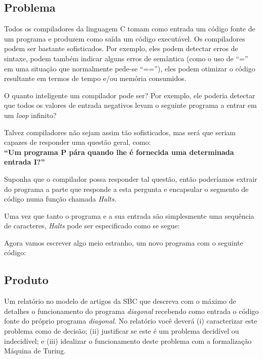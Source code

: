 \subsection{Problema}
Todos os compiladores da linguagem C tomam como entrada um código fonte de um
programa e produzem como saída um código executável.
Os compiladores podem ser bastante sofisticados. Por exemplo, eles
podem detectar erros de sintaxe, podem também indicar alguns erros de
semântica (como o uso de ``='' em uma situação que normalmente pede-se ``==''),
eles podem otimizar o código resultante em termos de tempo e/ou memória consumidos.

O quanto inteligente um compilador pode ser?
Por exemplo, ele poderia detectar que todos os valores de entrada negativos
levam o seguinte programa a entrar em um \textit{loop} infinito?



Talvez compiladores não sejam assim tão sofisticados, mas será
que seriam capazes de responder uma questão geral, como:
\\ \textbf{``Um programa P pára quando
lhe é fornecida uma determinada entrada I?''}

Suponha que o compilador possa responder tal questão, então poderíamos extrair
do programa a parte que responde a esta pergunta e
encapsular o segmento de código numa função chamada \textit{Halts}.


Uma vez que tanto o programa e a sua
entrada são simplesmente uma sequência de caracteres, \textit{Halts} pode ser
especificado como se segue:



Agora vamos escrever algo meio estranho, um novo programa com o seguinte código:



\subsection{Produto}
Um relatório no modelo de artigos da SBC que descreva com o máximo
de detalhes o funcionamento do programa \textit{diagonal} recebendo como entrada
o código fonte do próprio programa \textit{diagonal}.
No relatório você deverá (i) caracterizar este problema como de decisão;
(ii) justificar se este é um problema decidível ou indecidível; e (iii)
idealizar o funcionamento deste problema com a formalização Máquina de Turing.

